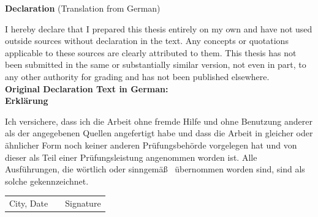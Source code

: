 \documentclass[%
				12pt,
				a4paper,
				oneside,
				titlepage,
				headsepline,
				numbers=noenddot,
				listof=totoc,
				index=totoc,
				bibliography=totoc]{scrartcl}
\theoremstyle{definition}
\begin{document}
	\thispagestyle{empty}          
	\begin{center}
		
	\end{center}
	\clearpage
	
	{
		
        {\LARGE \textbf{Declaration}}
        \newline(Translation from German)
        \vspace{10pt}
		
		\noindent I hereby declare that I prepared this thesis entirely on my own and have not used outside sources
		without declaration in the text. Any concepts or quotations applicable to these sources are
		clearly attributed to them. This thesis has not been submitted in the same or substantially similar
		version, not even in part, to any other authority for grading and has not been published elsewhere.\\
		
		{\LARGE \textbf{Original Declaration Text in German:}}\\[20pt]
		{\LARGE \textbf{Erkl\"arung}}
		\vspace{10pt}
		
		Ich versichere, dass ich die Arbeit ohne fremde Hilfe und ohne Benutzung anderer als der
		angegebenen Quellen angefertigt habe und dass die Arbeit in gleicher oder \"ahnlicher Form
		noch keiner anderen Pr\"ufungsbeh\"orde vorgelegen hat und von dieser als Teil einer
		Pr\"ufungsleistung angenommen worden ist. Alle Ausf\"uhrungen, die w\"ortlich oder sinngem\"a\ss~
		\"ubernommen worden sind, sind als solche ge\-kenn\-zeich\-net.\\[27pt]
		
		\begin{center}
			\begin{tabular}{l p{} r}
				\cline{1-1} \cline{3-3}
				\begin{minipage}[t]{0.4\textwidth}
					\centering
					City, Date
				\end{minipage}
				&
				\begin{minipage}[t]{0.2\textwidth}
				\end{minipage}
				&
				\begin{minipage}[t]{0.4\textwidth}
					\centering
					Signature
				\end{minipage}
			\end{tabular}
		\end{center}
	}
	\clearpage
	
	\thispagestyle{empty}          
	\begin{center}
		
	\end{center}
	\clearpage
\end{document}
